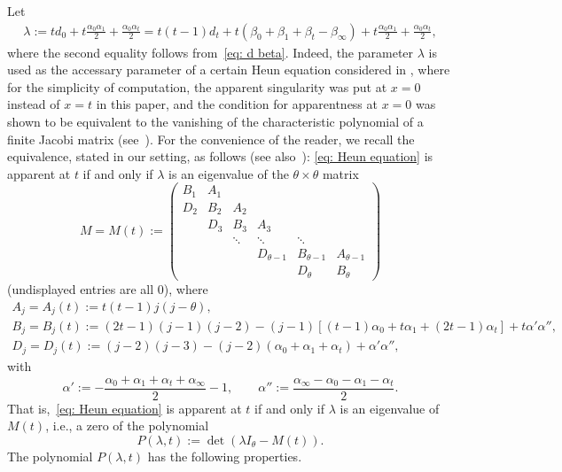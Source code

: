 \documentclass[11pt]{article}
\numberwithin{equation}{section}
\numberwithin{equation}{section}
\begin{document}
Let
\begin{gather} \label{eq: lambda}
 \lambda:=td_0+t\frac{\alpha_0\alpha_1}2
 +\frac{\alpha_0\alpha_t}2
 =t(t-1)d_t+t(\beta_0+\beta_1+\beta_t-\beta_\infty)
 +t\frac{\alpha_0\alpha_1}2+\frac{\alpha_0\alpha_t}2,
\end{gather}
where the second equality follows from~\eqref{eq: d beta}. Indeed,
the parameter $\lambda$ is used as the accessary parameter of a
certain Heun equation considered in \cite{Quadrilateral}, where for
the simplicity of computation, the apparent singularity was put at
$x=0$ instead of $x=t$ in this paper, and the condition for
apparentness at $x=0$ was shown to be equivalent to the vanishing of
the characteristic polynomial of a finite Jacobi matrix (see~\cite[Proposition 2.4 and equation~(2.8)]{Quadrilateral}). For the
convenience of the reader, we recall the equivalence, stated in our
setting, as follows (see also~\mbox{\cite[Lemma B.8]{Chen-Lin-Yang}}):
\eqref{eq: Heun equation} is apparent at $t$ if and only if
 $\lambda$ is an eigenvalue of the $\theta\times\theta$ matrix
 \begin{equation} \label{eq: M}
 M=M(t):=\begin{pmatrix}
 B_1 & A_1 & & & & \\
 D_2 & B_2 & A_2 & & & \\
 & D_3 & B_3 & A_3 & & \\
 & & \ddots & \ddots & \ddots & \\
 & & & D_{\theta-1} & B_{\theta-1} & A_{\theta-1} \\
 & & & & D_{\theta} & B_{\theta} \end{pmatrix}
 \end{equation}
 (undisplayed entries are all $0$), where
 \begin{gather*}
 A_j =A_j(t):=t(t-1)j(j-\theta), \\
 B_j =B_j(t):=(2t-1)(j-1)(j-2) -(j-1)[(t-1)\alpha_0+t\alpha_1
 +(2t-1)\alpha_t]
 +t\alpha'\alpha'', \\
 D_j =D_j(t):=(j-2)(j-3)-(j-2)(\alpha_0+\alpha_1+\alpha_t)
 +\alpha'\alpha'',
 \end{gather*}
 with
\[
 \alpha':=-\frac{\alpha_0+\alpha_1+\alpha_t+\alpha_\infty}2-1,
 \qquad \alpha'':=\frac{\alpha_\infty-\alpha_0-\alpha_1-\alpha_t}2.
\]
 That is,~\eqref{eq: Heun equation} is apparent at $t$ if and only if
 $\lambda$ is an eigenvalue of $M(t)$, i.e., a zero of the polynomial
\[
 P(\lambda,t):=\det(\lambda I_\theta-M(t)).
\]
 The polynomial $P(\lambda,t)$ has the following properties.
\end{document}
